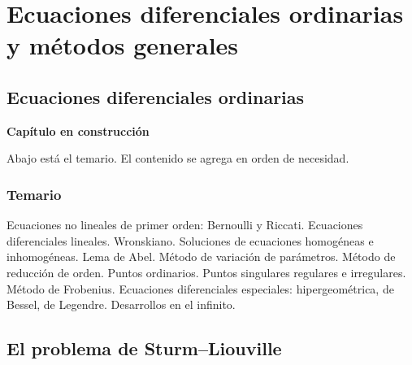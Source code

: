 \documentclass[
  spanish,
  a4paper,
]{scrbook}
\theoremstyle{definition}
\theoremstyle{plain}
\theoremstyle{definition}
\theoremstyle{plain}
\theoremstyle{definition}
\theoremstyle{remark}
\begin{document}
\part{Ecuaciones diferenciales ordinarias y métodos generales}

\chapter{Ecuaciones diferenciales ordinarias}\label{sec-edo}

\begin{tcolorbox}[enhanced jigsaw, arc=.35mm, bottomrule=.15mm, breakable, colback=white, colframe=quarto-callout-note-color-frame, left=2mm, leftrule=.75mm, opacityback=0, rightrule=.15mm, toprule=.15mm]
\begin{minipage}[t]{5.5mm}
\textcolor{quarto-callout-note-color}{\faInfo}
\end{minipage}%
\begin{minipage}[t]{\textwidth - 5.5mm}

\vspace{-3mm}\textbf{Capítulo en construcción}\vspace{3mm}

Abajo está el temario. El contenido se agrega en orden de necesidad.

\end{minipage}%
\end{tcolorbox}

\section*{Temario}\label{temario}


Ecuaciones no lineales de primer orden: Bernoulli y Riccati. Ecuaciones
diferenciales lineales. Wronskiano. Soluciones de ecuaciones homogéneas
e inhomogéneas. Lema de Abel. Método de variación de parámetros. Método
de reducción de orden. Puntos ordinarios. Puntos singulares regulares e
irregulares. Método de Frobenius. Ecuaciones diferenciales especiales:
hipergeométrica, de Bessel, de Legendre. Desarrollos en el infinito.

\chapter{El problema de Sturm--Liouville}\label{sec-sturm}
\end{document}
